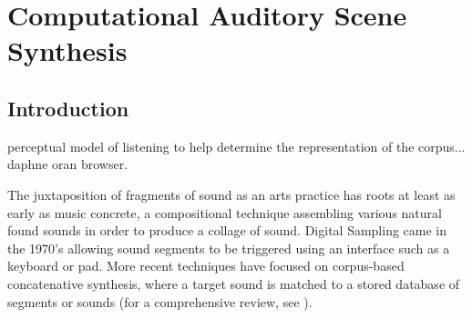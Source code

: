 \documentclass[a4paper,10pt,final]{ThesisStyle}
\begin{document}




\chapter{Computational Auditory Scene Synthesis}
\label{ch:synthesis-audio}
\minitoc



\section{Introduction}

perceptual model of listening to help determine the representation of the corpus... daphne oran browser.


The juxtaposition of fragments of sound as an arts practice has roots at least as early as music concrete, a compositional technique assembling various natural found sounds in order to produce a collage of sound.  Digital Sampling came in the 1970's allowing sound segments to be triggered using an interface such as a keyboard or pad.  More recent techniques have focused on corpus-based concatenative synthesis, where a target sound is matched to a stored database of segments or sounds (for a comprehensive review, see \cite{Schwarz2006}).  
\end{document}
